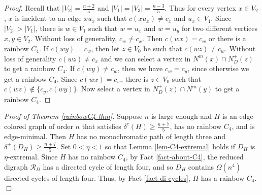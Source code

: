 \documentclass{article}
\begin{document}
\begin{proof}
Recall that $|V_2|=\frac{n+2}{5}$ and $|V_1|=|V_3|=\frac{n-3}{5}$. Thus for every vertex $x\in V_2$, $x$ is incident to an edge $xu_x$ such that $c(xu_x)\neq c_x$ and $u_x\in V_1$. Since $|V_2|>|V_1|$, there is $w\in V_1$ such that $w=u_x$ and $w=u_y$ for two different vertices $x, y\in V_2$.  Without loss of generality, $c_w\neq c_x$. Then $c(wx)=c_w$ or there is a rainbow $C_4$. If $c(wy)=c_w$, then let $z\in V_0$ be such that $c(wz)\neq c_w$. Without loss of generality $c(wz)\neq c_x$ and we can select a vertex in  $N^m(x)\cap N^+_D(z)$ to get a rainbow $C_4$. If $c(wy)\neq c_w$, then we have $c_w=c_y$, since otherwise we get a rainbow $C_4$. Since $c(wx)=c_w$, there is $z\in V_0$ such that $c(wz)\notin \{c_y, c(wy)\}$. Now select a vertex in $N^+_D(z)\cap N^m(y)$ to get a rainbow $C_4$.
\end{proof}
{\it Proof of Theorem \ref{rainbowC4-thm}.}
Suppose $n$ is large enough and $H$ is an edge-colored graph of order $n$ that satisfies $\delta^c(H)\geq \frac{n+7}{5}$, has no rainbow $C_4$, and is edge-minimal. Then $H$ has no monochromatic path of length three and $\delta^+(D_H)\geq \frac{n+7}{5}$.
Set $0<\eta< 1$ so that Lemma \ref{lem-C4-extremal} holds if $D_H$ is $\eta$-extremal. Since $H$ has no rainbow $C_4$, by  Fact \ref{fact-about-C4}, the reduced digraph $\mathcal{R}_D$ has a directed cycle of length four, and so $D_H$ contains $\Omega(n^4)$ directed cycles of length four. Thus, by Fact \ref{fact-di-cycles}, $H$ has a rainbow $C_4$.$\Box$


\end{document}
